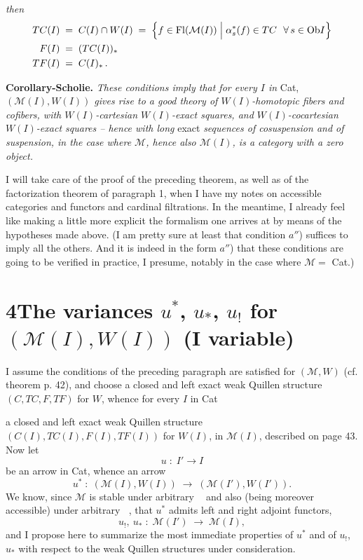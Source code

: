 \documentclass[11pt]{article}
\newcommand{\printedpage}[1]{\marginpar{\footnotesize p.~#1}}
\newcommand{\msp}[1]{\marginpar{\footnotesize [#1]}}
\newcommand{\limind}{\mathop{\underrightarrow{\mathrm{lim}}}}
\newcommand{\limproj}{\mathop{\underleftarrow{\mathrm{lim}}}}
\newcommand{\M}{\mathcal{M}}
\newcommand{\Fl}{\mathrm{Fl}}
\newcommand{\Ob}{\mathrm{Ob}}
\begin{document}
\printedpage{25}
\noindent\textit{then}
\[
\begin{aligned}
TC(I) \;&=\; C(I)\cap W(I) \;=\; \Bigl\{ f \in \Fl(\M(I)) \Bigm| \alpha_s^*(f) \in TC \ \ \forall\, s \in \Ob I \Bigr\}\\
F(I) \;&=\; (TC(I))_*\\
TF(I) \;&=\; C(I)_*\,.
\end{aligned}
\]

\textbf{Corollary-Scholie.} \textit{These conditions imply that for every $I$ in} Cat, \textit{$(\M(I),W(I))$ gives rise to a good theory of $W(I)$-homotopic fibers and cofibers, with $W(I)$-cartesian $W(I)$-exact squares, and $W(I)$-cocartesian $W(I)$-exact squares – hence with long} exact \textit{sequences of cosuspension and of suspension, in the case where $\M$, hence also $\M(I)$, is a category with a zero object.}

\noindent\msp{page 44}

I will take care of the proof of the preceding theorem, as well as of the factorization theorem of paragraph 1, when I have my notes on accessible categories and functors and cardinal filtrations. In the meantime, I already feel like making a little more explicit the formalism one arrives at by means of the hypotheses made above. (I am pretty sure at least that condition $a''$) suffices to imply all the others. And it is indeed in the form $a''$) that these conditions are going to be verified in practice, I presume, notably in the case where $\M = $ Cat.)

\section*{4\quad The variances $u^*$, $u_*$, $u_{!}$ for $(\M(I),W(I))$ (I variable)}

I assume the conditions of the preceding paragraph are satisfied for $(\M,W)$ (cf. theorem p. 42), and choose a closed and left exact weak Quillen structure $(C,TC,F,TF)$ for $W$, whence for every $I$ in Cat

\noindent\msp{page 45}

\noindent a closed and left exact weak Quillen structure $(C(I),TC(I),F(I),TF(I))$ for $W(I)$, in $\M(I)$, described on page 43. Now let
\[
u \;:\; I' \longrightarrow I
\]
be an arrow in Cat, whence an arrow
\[
u^* \;:\; (\M(I),W(I)) \;\longrightarrow\; (\M(I'),W(I')).
\]
We know, since $\M$ is stable under arbitrary $\limind$ and also (being moreover accessible) under arbitrary $\limproj$, that $u^*$ admits left and right adjoint functors,
\[
u_{!},\ u_* \;:\; \M(I') \;\longrightarrow\; \M(I),
\]
\printedpage{26}
and I propose here to summarize the most immediate properties of $u^*$ and of $u_{!}$, $u_*$ with respect to the weak Quillen structures under consideration.
\end{document}
